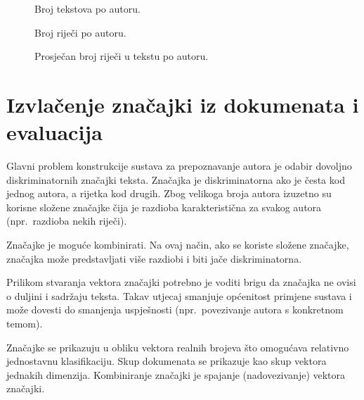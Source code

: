 \documentclass{article}
\begin{document}
\begin{figure}[htb]
\begin{center}

\end{center}
\caption{Broj tekstova po autoru.}
\label{fig:articlesPerAuthor}
\end{figure}

\begin{figure}[htb]
\begin{center}

\end{center}
\caption{Broj riječi po autoru.}
\label{fig:wordsPerAuthor}
\end{figure}

\begin{figure}[htb]
\begin{center}

\end{center}
\caption{Prosječan broj riječi u tekstu po autoru.}
\label{fig:avgWordsPerAuthorArticle}
\end{figure}

\section{Izvlačenje značajki iz dokumenata i evaluacija}
Glavni problem konstrukcije sustava za prepoznavanje autora je odabir dovoljno
diskriminatornih značajki teksta. Značajka je diskriminatorna ako je česta kod
jednog autora, a rijetka kod drugih. Zbog velikoga broja autora izuzetno su
korisne složene značajke čija je razdioba karakteristična za svakog autora
(npr.~razdioba nekih riječi).

Značajke je moguće kombinirati. Na ovaj način, ako se koriste složene značajke,
značajka može predstavljati više razdiobi i biti jače diskriminatorna.

Prilikom stvaranja vektora značajki potrebno je voditi brigu da značajka ne
ovisi o duljini i sadržaju teksta. Takav utjecaj smanjuje općenitost primjene
sustava i može dovesti do smanjenja uspješnosti (npr.~povezivanje autora s
konkretnom temom).

Značajke se prikazuju u obliku vektora realnih brojeva što omogućava relativno
jednostavnu klasifikaciju. Skup dokumenata se prikazuje kao skup vektora jednakih
dimenzija. Kombiniranje značajki je spajanje (nadovezivanje) vektora značajki.

\end{document}

